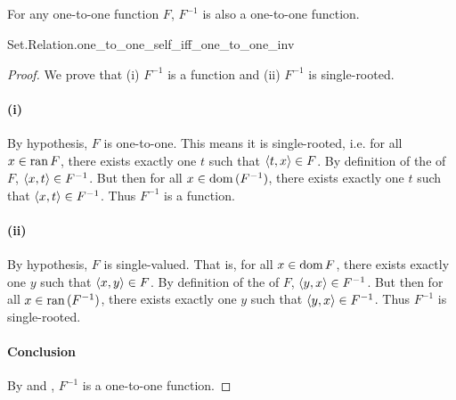 \documentclass{report}
\begin{document}
\subsection{}%

  \begin{lemma}
    For any one-to-one function $F$, $F^{-1}$ is also a one-to-one function.
  \end{lemma}

    {Set.Relation.one\_to\_one\_self\_iff\_one\_to\_one\_inv}

  \begin{proof}
    We prove that (i) $F^{-1}$ is a function and (ii) $F^{-1}$ is single-rooted.

    \paragraph{(i)}%

      By hypothesis, $F$ is one-to-one.
      This means it is single-rooted, i.e. for all $x \in \mathop{\text{ran}}{F}$, there exists
        exactly one $t$ such that $\left< t, x \right> \in F$.
      By definition of the  of $F$,
        $\left< x, t \right> \in F^{-1}$.
      But then for all $x \in \mathop{\text{dom}}{(F^{-1})}$, there exists exactly one $t$ such
        that $\left< x, t \right> \in F^{-1}$.
      Thus $F^{-1}$ is a function.

    \paragraph{(ii)}%

      By hypothesis, $F$ is single-valued.
      That is, for all $x \in \mathop{\text{dom}}{F}$, there exists exactly one $y$ such that
        $\left< x, y \right> \in F$.
      By definition of the  of $F$,
        $\left< y, x \right> \in F^{-1}$.
      But then for all $x \in \mathop{\text{ran}}{(F^{-1})}$, there exists exactly one $y$ such
        that $\left< y, x \right> \in F^{-1}$.
      Thus $F^{-1}$ is single-rooted.

    \paragraph{Conclusion}%

      By  and , $F^{-1}$ is
        a one-to-one function.

  \end{proof}
\end{document}
